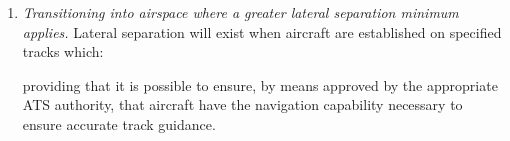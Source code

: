 \begin{enumeratesc}
\begin{enumerate}
\begin{enumerate}
            \item \textit{Transitioning into airspace where a greater lateral separation minimum applies.} Lateral separation will exist when aircraft are established on specified tracks which:

            \noindent providing that it is possible to ensure, by means approved by the appropriate ATS authority, that aircraft have the navigation capability necessary to ensure accurate track guidance.
        \end{enumerate}
    \end{enumerate}
\end{enumeratesc}